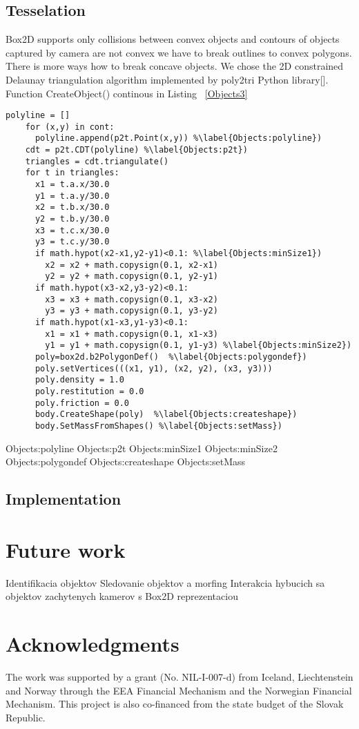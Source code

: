 \documentclass{ifacconf}
\begin{document}
\subsection{Tesselation}
Box2D supports only collisions between convex objects and contours of objects
captured by camera are not convex we have to break outlines to convex polygons.
There is more ways how to break concave objects. We chose the 2D constrained
Delaunay triangulation algorithm implemented by poly2tri Python
library[\cite{Delauanay}]. Function CreateObject() continous in Listing~
\ref{Objects3}
\begin{lstlisting}[name=Objects,firstnumber=auto,label=Objects3,caption=Creation
 of objects]
    polyline = []
    for (x,y) in cont:
      polyline.append(p2t.Point(x,y)) %\label{Objects:polyline})
    cdt = p2t.CDT(polyline) %\label{Objects:p2t})
    triangles = cdt.triangulate()
    for t in triangles:
      x1 = t.a.x/30.0
      y1 = t.a.y/30.0
      x2 = t.b.x/30.0
      y2 = t.b.y/30.0
      x3 = t.c.x/30.0
      y3 = t.c.y/30.0
      if math.hypot(x2-x1,y2-y1)<0.1: %\label{Objects:minSize1})
        x2 = x2 + math.copysign(0.1, x2-x1)
        y2 = y2 + math.copysign(0.1, y2-y1)
      if math.hypot(x3-x2,y3-y2)<0.1:
        x3 = x3 + math.copysign(0.1, x3-x2)
        y3 = y3 + math.copysign(0.1, y3-y2)
      if math.hypot(x1-x3,y1-y3)<0.1:
        x1 = x1 + math.copysign(0.1, x1-x3)
        y1 = y1 + math.copysign(0.1, y1-y3) %\label{Objects:minSize2})
      poly=box2d.b2PolygonDef()  %\label{Objects:polygondef})
      poly.setVertices(((x1, y1), (x2, y2), (x3, y3)))
      poly.density = 1.0
      poly.restitution = 0.0
      poly.friction = 0.0
      body.CreateShape(poly)  %\label{Objects:createshape})
      body.SetMassFromShapes() %\label{Objects:setMass})
\end{lstlisting}
Objects:polyline
Objects:p2t
Objects:minSize1
Objects:minSize2
Objects:polygondef
Objects:createshape
Objects:setMass

\subsection{Implementation}
\section{Future work}
Identifikacia objektov
Sledovanie objektov a morfing 
Interakcia hybucich sa objektov zachytenych kamerov s Box2D reprezentaciou

\section*{Acknowledgments}
The work was supported by a grant (No. NIL-I-007-d) from Iceland, Liechtenstein 
and Norway through the EEA Financial Mechanism and the Norwegian Financial 
Mechanism. This project is also co-financed from the state budget of the Slovak
Republic.


%
\end{document}
